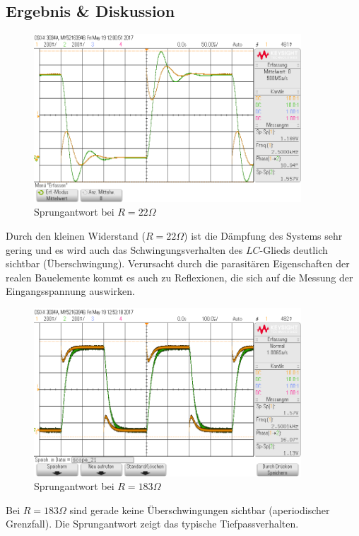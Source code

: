 \documentclass[12pt,a4paper,titlepage]{article}
\begin{document}
\subsection{Ergebnis \& Diskussion}
\begin{figure}[H]
  \centering
  \includegraphics[width=100mm]{sprungantwort_rlc_22.png}
  \caption{Sprungantwort bei $R=22\Omega$}
\end{figure}
Durch den kleinen Widerstand ($R=22\Omega$) ist die Dämpfung des Systems sehr gering und es wird auch das Schwingungsverhalten des $LC$-Glieds deutlich sichtbar (\"Uberschwingung). Verursacht durch die parasit\"aren Eigenschaften der realen Bauelemente kommt es auch zu Reflexionen, die sich auf die Messung der Eingangsspannung auswirken.

\begin{figure}[H]
  \centering
  \includegraphics[width=100mm]{sprungantwort_rlc_180.png}
  \caption{Sprungantwort bei $R=183\Omega$}
\end{figure}
\noindent Bei $R=183\Omega$ sind gerade keine \"Uberschwingungen sichtbar (aperiodischer Grenzfall). Die Sprungantwort zeigt das typische Tiefpassverhalten.
\end{document}
